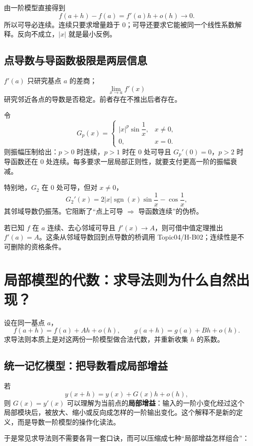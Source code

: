 \documentclass[11pt,a4paper]{ctexart}
\newcommand{\kw}[1]{\textbf{\color{deep}#1}}
\begin{document}
由一阶模型直接得到
\[
f(a+h)-f(a)=f'(a)h+o(h)\to0.
\]
所以可导必连续。连续只要求增量趋于 $0$；可导还要求它能被同一个线性系数解释。反向不成立，$\lvert x\rvert$ 就是最小反例。

\subsection{点导数与导函数极限是两层信息}

$f'(a)$ 只研究基点 $a$ 的差商；
\[
\lim_{x\to a}f'(x)
\]
研究邻近各点的导数是否稳定。前者存在不推出后者存在。

令
\[
G_p(x)=
\begin{cases}
\lvert x\rvert^p\sin\dfrac1x,&x\ne0,\\
0,&x=0.
\end{cases}
\]
则振幅压制给出：$p>0$ 时连续，$p>1$ 时在 $0$ 处可导且 $G_p'(0)=0$，$p>2$ 时导函数还在 $0$ 处连续。每多要求一层局部正则性，就要支付更高一阶的振幅衰减。

特别地，$G_2$ 在 $0$ 处可导，但对 $x\ne0$，
\[
G_2'(x)=2\lvert x\rvert\operatorname{sgn}(x)\sin\frac1x-\cos\frac1x,
\]
其邻域导数仍振荡。它阻断了“点上可导 $\Rightarrow$ 导函数连续”的伪桥。

若已知 $f$ 在 $a$ 连续、去心邻域可导且 $f'(x)\to A$，则可借中值定理推出 $f'(a)=A$。这条从邻域导数回到点导数的桥调用 Topic04/H-B02；连续性是不可删除的资格条件。

\section{局部模型的代数：求导法则为什么自然出现？}

设在同一基点 $a$，
\[
f(a+h)=f(a)+Ah+o(h),
\qquad
g(a+h)=g(a)+Bh+o(h).
\]
求导法则本质上是对这两份一阶模型做合法代数，并重新收集 $h$ 的系数。

\subsection{统一记忆模型：把导数看成局部增益}

若
\[
y(x+h)=y(x)+G(x)h+o(h),
\]
则 $G(x)=y'(x)$ 可以理解为当前点的\kw{局部增益}：输入的一阶小变化经过这个局部模块后，被放大、缩小或反向成怎样的一阶输出变化。这个解释不是新的定义，而是导数一阶模型的操作化读法。

于是常见求导法则不需要各背一套口诀，而可以压缩成七种“局部增益怎样组合”：
\end{document}
